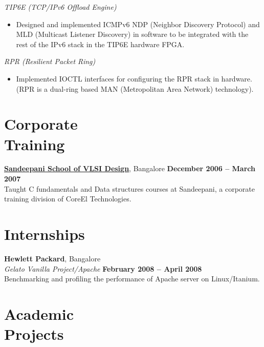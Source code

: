 \documentclass[a4paper,margin,line]{resume}
\begin{document}
\begin{resume}
	\textsl{TIP6E (TCP/IPv6 Offload Engine)}
	\begin{itemize}
		\item Designed and implemented ICMPv6 NDP (Neighbor Discovery Protocol) and MLD (Multicast Listener Discovery) in software to be integrated with the rest of the IPv6 stack in the TIP6E hardware FPGA. %
	\end{itemize}

	\textsl{RPR (Resilient Packet Ring)}
	\begin{itemize}
		\item Implemented IOCTL interfaces for configuring the RPR stack in hardware. (RPR is a dual-ring based MAN (Metropolitan Area Network) technology). %
	\end{itemize}


\section{\mysidestyle Corporate\\Training}

\href{http://www.sandeepani-vlsi.com/}{\textbf{Sandeepani School of VLSI Design}}, Bangalore \hfill \textbf{December 2006 -- March 2007}\\%
Taught C fundamentals and Data structures courses at Sandeepani, a corporate training division of CoreEl Technologies. 


\section{\mysidestyle Internships} 

\textbf{Hewlett Packard}, Bangalore \vspace{2mm}\\\vspace{1mm}%
    \textsl{Gelato Vanilla Project/Apache} \hfill \textbf{February 2008 -- April 2008}\\%
Benchmarking and profiling the performance of Apache server on Linux/Itanium.


\section{\mysidestyle Academic\\Projects}


\end{resume}
\end{document}

